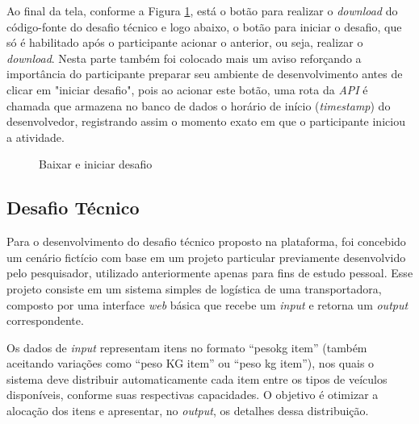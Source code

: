 \documentclass[english,brazilian]{UNISINOSartigo} %
\begin{document}
Ao final da tela, conforme a Figura \ref{fig:baixar_iniciar_desafio}, está o botão para realizar o \textit{download} do código-fonte do desafio técnico e logo abaixo, o botão para iniciar o desafio, que só é habilitado após o participante acionar o anterior, ou seja, realizar o \textit{download}. Nesta parte também foi colocado mais um aviso reforçando a importância do participante preparar seu ambiente de desenvolvimento antes de clicar em "iniciar desafio", pois ao acionar este botão, uma rota da \textit{API} é chamada que armazena no banco de dados o horário de início (\textit{timestamp}) do desenvolvedor, registrando assim o momento exato em que o participante iniciou a atividade.

\begin{figure}[ht]
    \caption{Baixar e iniciar desafio}
    \label{fig:baixar_iniciar_desafio}
    \centering
    \footnotesize
    \begin{minipage}{.9\textwidth}
        \centering
    \end{minipage}
\end{figure}
\FloatBarrier

\subsection{Desafio Técnico}

Para o desenvolvimento do desafio técnico proposto na plataforma, foi concebido um cenário fictício com base em um projeto particular previamente desenvolvido pelo pesquisador, utilizado anteriormente apenas para fins de estudo pessoal. Esse projeto consiste em um sistema simples de logística de uma transportadora, composto por uma interface \textit{web} básica que recebe um \textit{input} e retorna um \textit{output} correspondente.

Os dados de \textit{input} representam itens no formato “pesokg item” (também aceitando variações como “peso KG item” ou “peso kg item”), nos quais o sistema deve distribuir automaticamente cada item entre os tipos de veículos disponíveis, conforme suas respectivas capacidades. O objetivo é otimizar a alocação dos itens e apresentar, no \textit{output}, os detalhes dessa distribuição.
\end{document}
